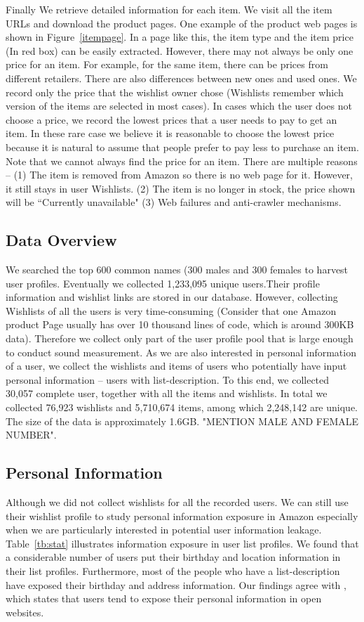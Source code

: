 Finally We retrieve detailed information for each item. We visit all the item URLs and download the product pages. One example of the product web pages is shown in Figure~\ref{itempage}. In a page like this, the item type and the item price (In red box) can be easily extracted. However, there may not always be only one price for an item. For example, for the same item, there can be prices from different retailers. There are also differences between new ones and used ones. We record only the price that the wishlist owner chose (Wishlists remember which version of the items are selected in most cases). In cases which the user does not choose a price, we record the lowest prices that a user needs to pay to get an item. In these rare case we believe it is reasonable to choose the lowest price because it is natural to assume that people prefer to pay less to purchase an item. Note that we cannot always find the price for an item. There are multiple reasons -- (1) The item is removed from Amazon so there is no web page for it. However, it still stays in user Wishlists. (2) The item is no longer in stock, the price shown will be ``Currently unavailable" (3) Web failures and anti-crawler mechanisms.

\subsection{Data Overview}
We searched the top 600 common names (300 males \cite{mnames} and 300 females \cite{fnames} to harvest user profiles. Eventually we collected 1,233,095 unique users.Their profile information and wishlist links are stored in our database. However, collecting Wishlists of all the users is very time-consuming (Consider that one Amazon product Page usually has over 10 thousand lines of code, which is around 300KB data). Therefore we collect only part of the user profile pool that is large enough to conduct sound measurement. As we are also interested in personal information of a user, we collect the wishlists and items of users who potentially have input personal information -- users with list-description. To this end, we collected 30,057 complete user, together with all the items and wishlists. In total we collected 76,923 wishlists and 5,710,674 items, among which 2,248,142 are unique. The size of the data is approximately 1.6GB. "MENTION MALE AND FEMALE NUMBER". 


\subsection{Personal Information}
Although we did not collect wishlists for all the recorded users. We can still use their wishlist profile to study personal information exposure in Amazon especially when we are particularly interested in potential user information leakage. Table~\ref{tb:stat} illustrates information exposure in user list profiles. We found that a considerable number of users put their birthday and location information in their list profiles. Furthermore, most of the people who have a list-description have exposed their birthday and address information. Our findings agree with \cite{frankowski2006you}, which states that users tend to expose their personal information in open websites. 

